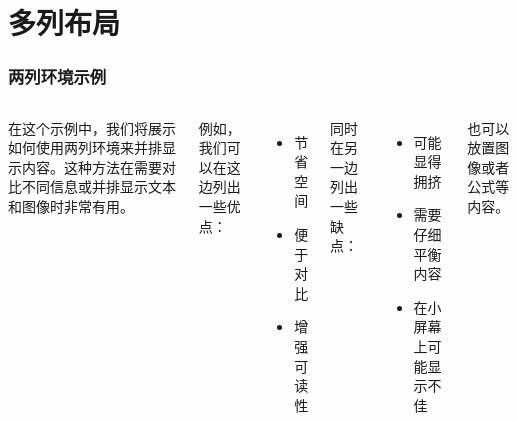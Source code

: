 
\section{多列布局}
\begin{frame}
\frametitle{两列环境示例}
\begin{columns}
在这个示例中，我们将展示如何使用两列环境来并排显示内容。这种方法在需要对比不同信息或并排显示文本和图像时非常有用。

例如，我们可以在这边列出一些优点：
\begin{itemize}
  \item 节省空间
  \item 便于对比
  \item 增强可读性
\end{itemize}

同时在另一边列出一些缺点：
\begin{itemize}
  \item 可能显得拥挤
  \item 需要仔细平衡内容
  \item 在小屏幕上可能显示不佳
\end{itemize}

也可以放置图像或者公式等内容。
\end{columns}
\end{frame}

